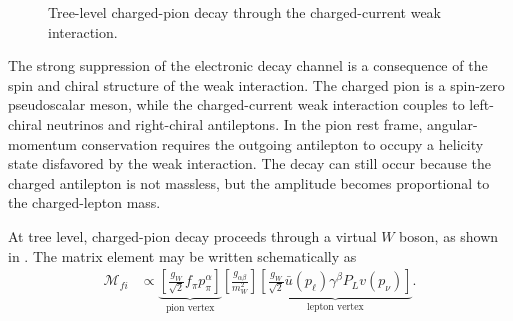 \begin{figure}[t]
  \centering
  \caption{
    Tree-level charged-pion decay through the charged-current weak interaction.
  }
  \label{fig:pion-decay-feynman}
\end{figure}

The strong suppression of the electronic decay channel is a consequence of the
spin and chiral structure of the weak interaction. The charged pion is a
spin-zero pseudoscalar meson, while the charged-current weak interaction couples
to left-chiral neutrinos and right-chiral antileptons. In the pion rest frame,
angular-momentum conservation requires the outgoing antilepton to occupy a
helicity state disfavored by the weak interaction. The decay can still occur
because the charged antilepton is not massless, but the amplitude becomes
proportional to the charged-lepton mass.

At tree level, charged-pion decay proceeds through a virtual \(W\) boson, as
shown in . The matrix element may be written
schematically as
\begin{align}
\mathcal{M}_{fi}
&\propto
\underbrace{
\left[
\frac{g_W}{\sqrt{2}}
f_\pi
p_\pi^\alpha
\right]
}_{\text{pion vertex}}
\left[
\frac{g_{\alpha\beta}}{m_W^2}
\right]
\underbrace{
\left[
\frac{g_W}{\sqrt{2}}
\bar{u}(p_\ell)\gamma^\beta
P_L
v(p_\nu)
\right]
}_{\text{lepton vertex}} .
\label{eq:pion-matrix-element-intro}
\end{align}

